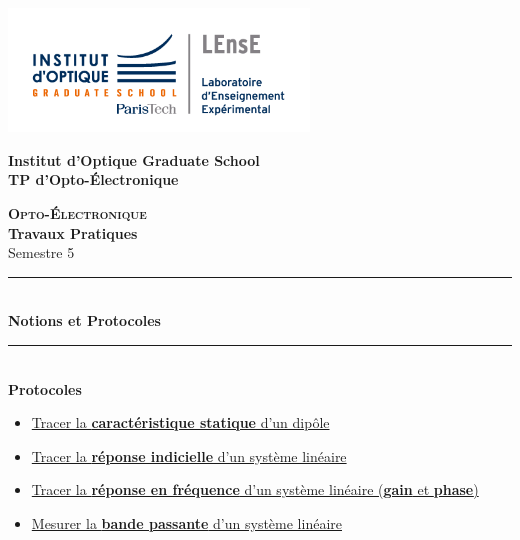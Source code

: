 \documentclass[a4paper,11pt,twoside]{book} %
\begin{document}
\begin{titlepage}

\begin{center}
	\begin{minipage}{2.5cm}
	\begin{center}
		\includegraphics[width=8cm]{images/Logo-LEnsE.png}
	\end{center}
\end{minipage}\hfill
\begin{minipage}{10cm}
	\begin{center}
	\textbf{Institut d'Optique Graduate School }\\[0.1cm]
    \textbf{TP d'Opto-Électronique}


	\end{center}
\end{minipage}\hfill


\vspace{1.0cm}


{\huge \bfseries \textsc{Opto-Électronique}} \\[0.5cm]
{\large \bfseries Travaux Pratiques} \\[0.2cm]
Semestre 5

\vspace{0.5cm}
\rule{\linewidth}{0.3mm} \\[0.4cm]
{ \huge \bfseries\color{violet_iogs} Notions et Protocoles \\[0.4cm] }
\rule{\linewidth}{0.3mm} \\[1cm]


{\large \textbf{Protocoles}}

\begin{itemize}[label=$\blacktriangleright$]
	\item \hyperref[ressource:CaracStat]{Tracer la \textbf{caractéristique statique} d'un dipôle}
	\item \hyperref[ressource:RepIndic]{Tracer la \textbf{réponse indicielle} d'un système linéaire}
	\item \hyperref[ressource:RepFreq]{Tracer la \textbf{réponse en fréquence} d'un système linéaire (\textbf{gain} et \textbf{phase})}
	\item \hyperref[ressource:BandePassante]{Mesurer la \textbf{bande passante} d'un système linéaire}
\end{itemize}


\end{center}
\end{titlepage}
\end{document}

